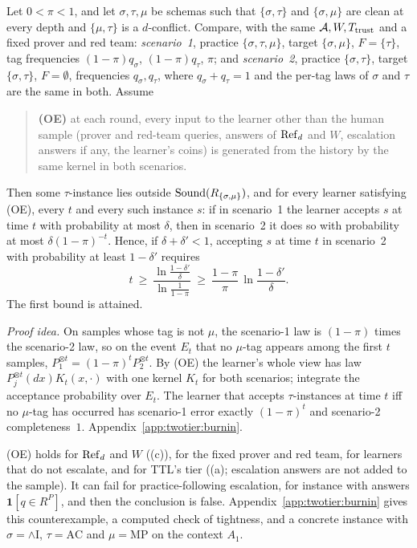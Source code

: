 \begin{theorem}\label{thm:twotier:burnin}
Let $0<\pi<1$, and let $\sigma,\tau,\mu$ be schemas such that $\{\sigma,\tau\}$ and $\{\sigma,\mu\}$ are clean at every depth and $\{\mu,\tau\}$ is a $d$-conflict. Compare, with the same $\mathcal{A},W,T_{\mathrm{trust}}$ and a fixed prover and red team:
\emph{scenario~1}, practice $\{\sigma,\tau,\mu\}$, target $\{\sigma,\mu\}$, $F=\{\tau\}$, tag frequencies $(1-\pi)q_\sigma$, $(1-\pi)q_\tau$, $\pi$; and
\emph{scenario~2}, practice $\{\sigma,\tau\}$, target $\{\sigma,\tau\}$, $F=\emptyset$, frequencies $q_\sigma,q_\tau$,
where $q_\sigma+q_\tau=1$ and the per-tag laws of $\sigma$ and $\tau$ are the same in both. Assume
\begin{quote}
\textbf{(OE)} at each round, every input to the learner other than the human sample (prover and red-team queries, answers of $\mathrm{Ref}_d$ and $W$, escalation answers if any, the learner's coins) is generated from the history by the same kernel in both scenarios.
\end{quote}
Then some $\tau$-instance lies outside $\mathrm{Sound}(R_{\{\sigma,\mu\}})$, and for every learner satisfying (OE), every $t$ and every such instance $s$: if in scenario~1 the learner accepts $s$ at time $t$ with probability at most $\delta$, then in scenario~2 it does so with probability at most $\delta(1-\pi)^{-t}$. Hence, if $\delta+\delta'<1$, accepting $s$ at time $t$ in scenario~2 with probability at least $1-\delta'$ requires
\[
t\ \ge\ \frac{\ln\frac{1-\delta'}{\delta}}{\ln\frac1{1-\pi}}\ \ge\ \frac{1-\pi}{\pi}\,\ln\frac{1-\delta'}{\delta}.
\]
The first bound is attained.
\end{theorem}

\noindent\emph{Proof idea.} On samples whose tag is not $\mu$, the scenario-1 law is $(1-\pi)$ times the scenario-2 law, so on the event $E_t$ that no $\mu$-tag appears among the first $t$ samples, $P_1^{\otimes t}=(1-\pi)^tP_2^{\otimes t}$. By (OE) the learner's whole view has law $P_j^{\otimes t}(dx)K_t(x,\cdot)$ with one kernel $K_t$ for both scenarios; integrate the acceptance probability over $E_t$. The learner that accepts $\tau$-instances at time $t$ iff no $\mu$-tag has occurred has scenario-1 error exactly $(1-\pi)^t$ and scenario-2 completeness~$1$. Appendix~\ref{app:twotier:burnin}.

(OE) holds for $\mathrm{Ref}_d$ and $W$ ((c)), for the fixed prover and red team, for learners that do not escalate, and for TTL's tier ((a); escalation answers are not added to the sample). It can fail for practice-following escalation, for instance with answers $\mathbf 1[q\in R^P]$, and then the conclusion is false. Appendix~\ref{app:twotier:burnin} gives this counterexample, a computed check of tightness, and a concrete instance with $\sigma=\wedge\mathrm I$, $\tau=\mathrm{AC}$ and $\mu=\mathrm{MP}$ on the context $A_1$.

